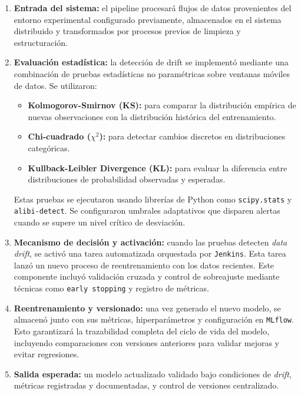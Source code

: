 \begin{enumerate}
    \item \textbf{Entrada del sistema:} el pipeline procesará flujos de datos provenientes del entorno experimental configurado previamente, almacenados en el sistema distribuido y transformados por procesos previos de limpieza y estructuración.
    
    \item \textbf{Evaluación estadística:} la detección de drift se implementó mediante una combinación de pruebas estadísticas no paramétricas sobre ventanas móviles de datos. Se utilizaron:
    \begin{itemize}
      \item \textbf{Kolmogorov-Smirnov (KS):} para comparar la distribución empírica de nuevas observaciones con la distribución histórica del entrenamiento.
      \item \textbf{Chi-cuadrado (\(\chi^2\)):} para detectar cambios discretos en distribuciones categóricas.
      \item \textbf{Kullback-Leibler Divergence (KL):} para evaluar la diferencia entre distribuciones de probabilidad observadas y esperadas.
    \end{itemize}
    Estas pruebas se ejecutaron usando librerías de Python como \texttt{scipy.stats} y \texttt{alibi-detect}. Se configuraron umbrales adaptativos que disparen alertas cuando se supere un nivel crítico de desviación.
    
    \item \textbf{Mecanismo de decisión y activación:} cuando las pruebas detecten \textit{data drift}, se activó una tarea automatizada orquestada por \texttt{Jenkins}. Esta tarea lanzó un nuevo proceso de reentrenamiento con los datos recientes. Este componente incluyó validación cruzada y control de sobreajuste mediante técnicas como \texttt{early stopping} y registro de métricas.
    
    \item \textbf{Reentrenamiento y versionado:} una vez generado el nuevo modelo, se almacenó junto con sus métricas, hiperparámetros y configuración en \texttt{MLflow}. Esto garantizará la trazabilidad completa del ciclo de vida del modelo, incluyendo comparaciones con versiones anteriores para validar mejoras y evitar regresiones.
    
    \item \textbf{Salida esperada:} un modelo actualizado validado bajo condiciones de \textit{drift}, métricas registradas y documentadas, y control de versiones centralizado.


\end{enumerate}
